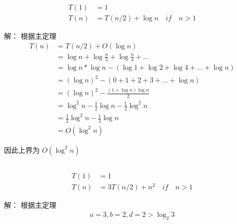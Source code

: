 \subsection{}
\begin{equation}
    \begin{aligned}
        T(1) &=1\\
        T(n) &=T(n/2)+ \log n\quad if\quad n>1
    \end{aligned}
    \nonumber
\end{equation}

解：
根据主定理
\begin{equation}
    \begin{aligned}
        T(n) &= T(n/2) + O(\log n)\\
            &= \log n + \log \frac{n}{2} + \log \frac{n}{4} + ...\\
            &= \log n * \log n - (\log 1 + \log 2 + \log 4 + ... + \log n)\\
            &= (\log n) ^ 2 - (0+1+2+3+...+\log n)\\
            &= (\log n)^2 - \frac{(1+\log n)\log n}{2}\\
            &= \log^2 n - \frac{1}{2}\log n - \frac{1}{2} \log^2 n\\
            &= \frac{1}{2} \log^2 n - \frac{1}{2} \log n\\
            &= O(\log^2 n)
    \end{aligned}
    \nonumber
\end{equation}

因此上界为 $O(\log^2 n)$

\subsection{}
\begin{equation}
    \begin{aligned}
        T(1) &=1\\
        T(n) &=3T(n/2)+ n^{2} \quad if\quad n>1
    \end{aligned}
    \nonumber
\end{equation}

解：
根据主定理
\begin{equation}
    \begin{aligned}
        a=3,b=2, d=2 > \log_{2}3 \\
    \end{aligned}
    \nonumber
\end{equation}


